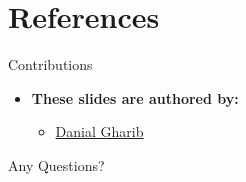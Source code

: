 \documentclass[serif, aspectratio=169]{beamer}
\begin{document}
    \section{References}

    \begin{frame}{Contributions}
        \begin{itemize}
            \item \textbf{These slides are authored by:}
            \begin{itemize}
                \setlength{\itemsep}{10pt} %
                \item \href{https://github.com/Danial-Gharib}{Danial Gharib}
            \end{itemize}
        \end{itemize}

    \end{frame}

    \begin{frame}[allowframebreaks]
        
        
        \nocite{*}
    \end{frame}

    \begin{frame}
        \begin{center}
        {\Huge Any Questions?}
        \end{center}
    \end{frame}
\end{document}
